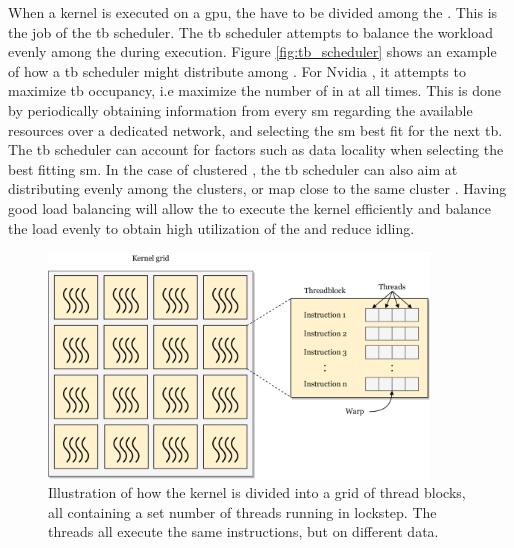 When a kernel is executed on a \acrshort{gpu}, the  have to be divided among the . This is the job of the \acrshort{tb} scheduler. The \acrshort{tb} scheduler attempts to balance the workload evenly among the  during execution. Figure \ref{fig:tb_scheduler} shows an example of how a \acrshort{tb} scheduler might distribute  among . For Nvidia , it attempts to maximize \acrshort{tb} occupancy\cite{CTA_scheduling}, i.e maximize the number of  in  at all times. This is done by periodically obtaining information from every \acrshort{sm} regarding the available resources over a dedicated network, and selecting the \acrshort{sm} best fit for the next \acrshort{tb}. The \acrshort{tb} scheduler can account for factors such as data locality when selecting the best fitting \acrshort{sm}. In the case of clustered , the \acrshort{tb} scheduler can also aim at distributing  evenly among the clusters, or map close  to the same cluster \cite{wang2020modeling}. Having good load balancing will allow the  to execute the kernel efficiently and balance the load evenly to obtain high utilization of the  and reduce idling.

\begin{figure}
    \centering
    \includegraphics[width=0.9\textwidth]{figures/grid.png}
    \caption[Relating the kernel grid, warps and threads]{Illustration of how the kernel is divided into a grid of thread blocks, all containing a set number of threads running in lockstep. The threads all execute the same instructions, but on different data.}
    \label{fig:kernel_work_items}
\end{figure}

